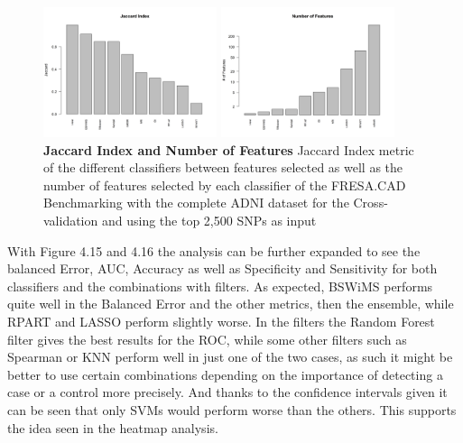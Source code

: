\begin{figure}[!ht]
\centerline{\includegraphics[width=2in]{images/results/fresaJac.png}}
\centerline{\includegraphics[width=2in]{images/results/fresaFeatures.png}}
\caption{{\bf Jaccard Index and Number of Features} 
Jaccard Index metric of the different classifiers between features selected as well as the number of features selected by each classifier of the FRESA.CAD Benchmarking with the complete ADNI dataset for the Cross-validation and using the top 2,500 SNPs as input }
\label{fig16}
\end{figure}
\newpage
With Figure 4.15 and 4.16 the analysis can be further expanded to see the balanced Error, AUC, Accuracy as well as Specificity and Sensitivity for both classifiers and the combinations with filters. As expected, BSWiMS performs quite well in the Balanced Error and the other metrics, then the ensemble, while RPART and LASSO perform slightly worse. In the filters the Random Forest filter gives the best results for the ROC, while some other filters such as Spearman or KNN perform well in just one of the two cases, as such it might be better to use certain combinations depending on the importance of detecting a case or a control more precisely. And thanks to the confidence intervals given it can be seen that only SVMs would perform worse than the others. This supports the idea seen in the heatmap analysis.
\clearpage
